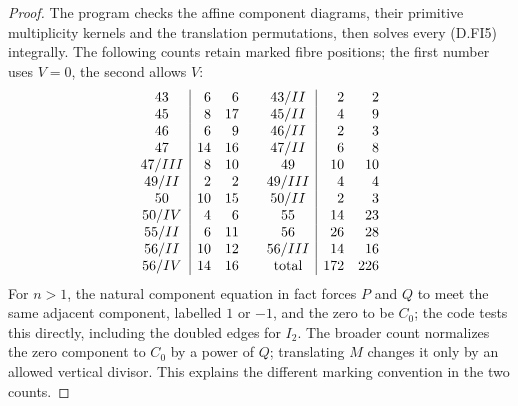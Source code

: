 \begin{proof}
The program checks the affine component diagrams, their primitive
multiplicity kernels and the translation permutations, then solves
every (D.FI5) integrally. The following counts retain marked fibre
positions; the first number uses $V=0$, the second allows $V$:
\[
\begin{array}{c|rr@{\qquad}c|rr}
43&6&6&43/II&2&2\\
45&8&17&45/II&4&9\\
46&6&9&46/II&2&3\\
47&14&16&47/II&6&8\\
47/III&8&10&49&10&10\\
49/II&2&2&49/III&4&4\\
50&10&15&50/II&2&3\\
50/IV&4&6&55&14&23\\
55/II&6&11&56&26&28\\
56/II&10&12&56/III&14&16\\
56/IV&14&16&\text{total}&172&226
\end{array}
\]
For $n>1$, the natural component equation in fact forces
$P$ and $Q$ to meet the same adjacent component, labelled $1$ or
$-1$, and the zero to be $C_0$; the code tests this directly,
including the doubled edges for $I_2$. The broader count normalizes
the zero component to $C_0$ by a power of $Q$; translating $M$
changes it only by an allowed vertical divisor. This explains
the different marking convention in the two counts.
\end{proof}
